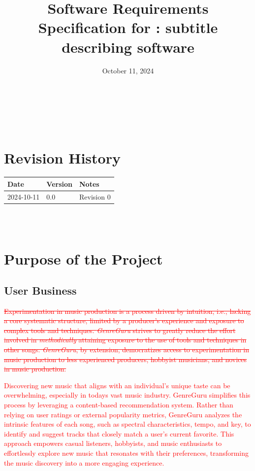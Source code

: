 \documentclass[12pt]{article}
\begin{document}
\title{Software Requirements Specification for \progname: subtitle describing software} 
\author{\authname}
\date{October 11, 2024}
	
\maketitle

~\newpage


\tableofcontents

~\newpage

\section*{Revision History}

\begin{tabularx}{\textwidth}{p{3cm}p{2cm}X}
\toprule {\textbf{Date}} & {\textbf{Version}} & {\textbf{Notes}}\\
\midrule
2024-10-11 & 0.0 & Revision 0\\
\bottomrule
\end{tabularx}

~\\

~\newpage
\section{Purpose of the Project}
\subsection{User Business}
\textcolor{red}{\sout{Experimentation in music production is a process driven by intuition, i.e., lacking a core systematic structure, limited by a producer's experience and exposure to complex tools and techniques. \emph{GenreGuru} strives to greatly reduce the effort involved in \emph{methodically} attaining exposure to the use of tools and techniques in other songs. \emph{GenreGuru}, by extension, democratizes access to experimentation in music production to less experienced producers, hobbyist musicians, and novices in music production.}}

\textcolor{red}{Discovering new music that aligns with an individual's unique taste can be overwhelming, especially in todays vast music industry. 
GenreGuru simplifies this process by leveraging a content-based recommendation system. 
Rather than relying on user ratings or external popularity metrics, GenreGuru analyzes the intrinsic features of each song, 
such as spectral characteristics, tempo, and key, to identify and suggest tracks that closely match a user's current favorite. 
This approach empowers casual listeners, hobbyists, and music enthusiasts to effortlessly explore new music that resonates with their preferences, 
transforming the music discovery into a more engaging experience.}
\end{document}
